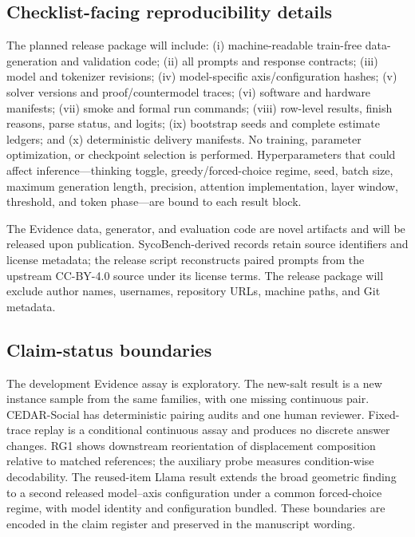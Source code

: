 \documentclass[letterpaper]{article}
\begin{document}
\subsection{Checklist-facing reproducibility details}

The planned release package will include: (i) machine-readable train-free data-generation and validation code; (ii) all prompts and response contracts; (iii) model and tokenizer revisions; (iv) model-specific axis/configuration hashes; (v) solver versions and proof/countermodel traces; (vi) software and hardware manifests; (vii) smoke and formal run commands; (viii) row-level results, finish reasons, parse status, and logits; (ix) bootstrap seeds and complete estimate ledgers; and (x) deterministic delivery manifests.  No training, parameter optimization, or checkpoint selection is performed.  Hyperparameters that could affect inference---thinking toggle, greedy/forced-choice regime, seed, batch size, maximum generation length, precision, attention implementation, layer window, threshold, and token phase---are bound to each result block.

The Evidence data, generator, and evaluation code are novel artifacts and will be released upon publication.  SycoBench-derived records retain source identifiers and license metadata; the release script reconstructs paired prompts from the upstream CC-BY-4.0 source under its license terms.  The release package will exclude author names, usernames, repository URLs, machine paths, and Git metadata.

\subsection{Claim-status boundaries}

The development Evidence assay is exploratory.  The new-salt result is a new instance sample from the same families, with one missing continuous pair.  CEDAR-Social has deterministic pairing audits and one human reviewer.  Fixed-trace replay is a conditional continuous assay and produces no discrete answer changes.  RG1 shows downstream reorientation of displacement composition relative to matched references; the auxiliary probe measures condition-wise decodability.  The reused-item Llama result extends the broad geometric finding to a second released model--axis configuration under a common forced-choice regime, with model identity and configuration bundled.  These boundaries are encoded in the claim register and preserved in the manuscript wording.


\end{document}
